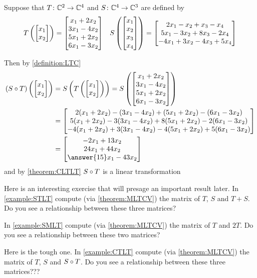 \documentclass{ximera}
\begin{document}
\begin{example}

Suppose that $T\colon \mathbb{C}^{2}\rightarrow\mathbb{C}^{4}$ and $S\colon \mathbb{C}^{4}\rightarrow\mathbb{C}^{3}$ are defined by
\begin{align*}
T\left(\begin{bmatrix}x_1\\x_2\end{bmatrix}\right)=\begin{bmatrix}x_1+2x_2\\3x_1-4x_2\\5x_1+2x_2\\6x_1-3x_2\end{bmatrix}
&&
S\left(\begin{bmatrix}x_1\\x_2\\x_3\\x_4\end{bmatrix}\right)=
\begin{bmatrix}2x_1-x_2+x_3-x_4\\5x_1-3x_2+8x_3-2x_4\\-4x_1+3x_2-4x_3+5x_4\end{bmatrix}
\end{align*}



Then by \ref{definition:LTC}
\begin{align*}
\lteval{(\compose{S}{T})}{\colvector{x_1\\x_2}}&=
\lteval{S}{\lteval{T}{\colvector{x_1\\x_2}}}
=\lteval{S}{\colvector{x_1+2x_2\\3x_1-4x_2\\5x_1+2x_2\\6x_1-3x_2}}\\
&=\colvector{
2(x_1+2x_2)-(3x_1-4x_2)+(5x_1+2x_2)-(6x_1-3x_2)\\
5(x_1+2x_2)-3(3x_1-4x_2)+8(5x_1+2x_2)-2(6x_1-3x_2)\\
-4(x_1+2x_2)+3(3x_1-4x_2)-4(5x_1+2x_2)+5(6x_1-3x_2)
}\\
&=\colvector{
-2x_1+13x_2\\
24x_1+44x_2\\
\answer{15}x_1-43x_2
}
\end{align*}
and by \ref{theorem:CLTLT} ${S}\circ{T}$ is a linear transformation
\begin{multipleChoice}
\end{multipleChoice}

\end{example}

Here is an interesting exercise that will presage an important result later.
In \ref{example:STLT} compute (via \ref{theorem:MLTCV}) the matrix of  $T$, $S$ and $T+S$.  Do you see a relationship between these three matrices?



In \ref{example:SMLT} compute (via \ref{theorem:MLTCV}) the matrix of  $T$ and  $2T$.  Do you see a relationship between these two matrices?



Here is the tough one.  In \ref{example:CTLT} compute (via \ref{theorem:MLTCV}) the matrix of  $T$, $S$ and ${S}\circ{T}$.  Do you see a relationship between these three matrices???
\end{document}
